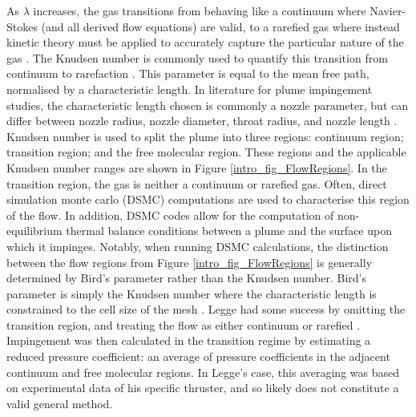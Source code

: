 \documentclass[journal]{new-aiaa}
\begin{document}
As $\lambda$ increases, the gas transitions from behaving like a continuum where Navier-Stokes (and all derived flow equations) are valid, to a rarefied gas where instead kinetic theory must be applied to accurately capture the particular nature of the gas \cite{pittPlumeImpingementStudies}. The Knudsen number is commonly used to quantify this transition from continuum to rarefaction \cite{knudsenGesetzeMolekularstromungUnd2006}. This parameter is equal to the mean free path, normalised by a characteristic length. In literature for plume impingement studies, the characteristic length chosen is commonly a nozzle parameter, but can differ between nozzle radius, nozzle diameter, throat radius, and nozzle length \cite{caiGaskineticSolutionsHigh2013,sharmaDSMCSimulationRocket2023,singhalNumericalStudyNozzle2024,subramanianUnderexpandedJetImpingement2024}. Knudsen number is used to split the plume into three regions: continuum region; transition region; and the free molecular region. These regions and the applicable Knudsen number ranges are shown in Figure \ref{intro_fig_FlowRegions}. In the transition region, the gas is neither a continuum or rarefied gas. Often, direct simulation monte carlo (DSMC) computations are used to characterise this region of the flow. In addition, DSMC codes allow for the computation of non-equilibrium thermal balance conditions between a plume and the surface upon which it impinges. Notably, when running DSMC calculations, the distinction between the flow regions from Figure \ref{intro_fig_FlowRegions} is generally determined by Bird's parameter rather than the Knudsen number. Bird's parameter is simply the Knudsen number where the characteristic length is constrained to the cell size of the mesh \cite{birdMolecularGasDynamics2003}. Legge had some success by omitting the transition region, and treating the flow as either continuum or rarefied \cite{leggeModellingControlThruster1982}. Impingement was then calculated in the transition regime by estimating a reduced pressure coefficient: an average of pressure coefficients in the adjacent continuum and free molecular regions. In Legge's case, this averaging was based on experimental data of his specific thruster, and so likely does not constitute a valid general method.
\end{document}
